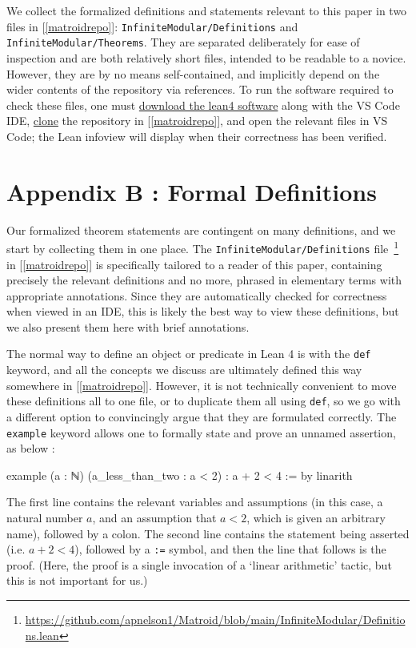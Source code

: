 \documentclass{amsart}
\theoremstyle{plain}
\theoremstyle{definition}
\newcommand{\smalltt}[1]{{\small\texttt{#1}}}
\begin{document}
We collect the formalized definitions and statements relevant to this paper in two files in [\ref{matroidrepo}]: 
\smalltt{InfiniteModular/Definitions} and \smalltt{InfiniteModular/Theorems}. 
They are separated deliberately for ease of inspection and are both relatively short files, 
intended to be readable to a novice. 
However, they are by no means self-contained, 
and implicitly depend on the wider contents of the repository via references.
To run the software required to check these files, 
one must \href{https://docs.lean-lang.org/lean4/doc/quickstart.html}{download the lean4 software} along with the VS Code 
IDE, 
\href{https://docs.github.com/en/repositories/creating-and-managing-repositories/cloning-a-repository}{clone} the repository in [\ref{matroidrepo}], and open the relevant files in VS Code; the Lean infoview
will display when their correctness has been verified. 

\section*{Appendix B : Formal Definitions}
Our formalized theorem statements are contingent on many definitions, 
and we start by collecting them in one place. 
The \smalltt{InfiniteModular/Definitions} 
file~\footnote{\scriptsize \url{https://github.com/apnelson1/Matroid/blob/main/InfiniteModular/Definitions.lean}}
in [\ref{matroidrepo}] is specifically tailored to a reader of this paper, 
containing precisely the relevant definitions and no more, 
phrased in elementary terms with appropriate annotations. 
Since they are automatically checked for correctness when viewed in an IDE,
this is likely the best way to view these definitions,
but we also present them here with brief annotations. 

The normal way to define an object or predicate in Lean 4 is with the \smalltt{def}
keyword, and all the concepts we discuss are ultimately defined this way somewhere
in [\ref{matroidrepo}]. 
However, it is not technically convenient to move these definitions 
all to one file, or to duplicate them all using \smalltt{def}, so we go with 
a different option to convincingly argue that they are formulated correctly. 
The \smalltt{example} keyword allows one to formally 
state and prove an unnamed assertion, as below : 
\begin{leancode}
  example (a : ℕ) (a_less_than_two : a < 2) : 
    a + 2 < 4 := by 
      linarith
\end{leancode}
The first line contains the relevant variables and assumptions 
(in this case, a natural number $a$, and an assumption that $a < 2$,
which is given an arbitrary name), 
followed by a colon. The second line contains the statement being asserted 
(i.e. $a + 2 < 4$), followed by a \smalltt{:=} symbol, 
and then the line that follows is the proof.
(Here, the proof is a single invocation of a `linear arithmetic' tactic,
but this is not important for us.) 
\end{document}
